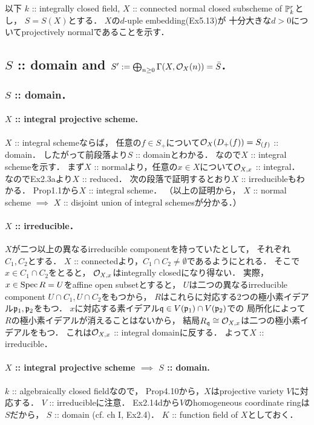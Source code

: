 \documentclass[a4paper]{jsarticle}
\begin{document}
    以下
    $k$ :: integrally closed field,
    $X$ :: connected normal closed subscheme of $\mathbb{P}_k^r$とし，
    $S=S(X)$とする．
    $X$の$d$-uple embedding(Ex5.13)が
    十分大きな$d>0$についてprojectively normalであることを示す．

    \subsection{$S$ :: domain and $S':=\bigoplus_{n \geq 0} \Gamma(X,\mathcal{O}_X(n))=\bar{S}$.}
    \subsubsection{$S$ :: domain．}
    \paragraph{$X$ :: integral projective scheme.}
    $X$ :: integral schemeならば，
    任意の$f \in S_+$について$\mathcal{O}_X(D_+(f))=S_{(f)}$ :: domain．
    したがって前段落より$S$ :: domainとわかる．
    なので$X$ :: integral schemeを示す．
    まず$X$ :: normalより，任意の$x \in X$について$\mathcal{O}_{X,x}$ :: integral．
    なのでEx2.3aより$X$ :: reduced．
    次の段落で証明するとおり$X$ :: irreducibleもわかる．
    Prop1.1から$X$ :: integral scheme．
    （以上の証明から，
    $X$ :: normal scheme $\implies$ $X$ :: disjoint union of integral schemesが分かる．）

    \paragraph{$X$ :: irreducible．}
    $X$が二つ以上の異なるirreducible componentを持っていたとして，
    それぞれ$C_1, C_2$とする．
    $X$ :: connectedより，$C_1 \cap C_2 \neq \emptyset$であるようにとれる．
    そこで$x \in C_1 \cap C_2$をとると，
    $\mathcal{O}_{X,x}$はintegrally closedになり得ない．
    実際，
    $x \in \operatorname{Spec} R=U$をaffine open subsetとすると，
    $U$は二つの異なるirreducible component $U \cap C_1, U \cap C_2$をもつから，
    $R$はこれらに対応する2つの極小素イデアル$\mathfrak{p}_1, \mathfrak{p}_2$をもつ．
    $x$に対応する素イデアル$\mathfrak{q} \in V(\mathfrak{p}_1) \cap V(\mathfrak{p}_2)$での
    局所化によって$R$の極小素イデアルが消えることはないから，
    結局$R_{\mathfrak{q}} \cong \mathcal{O}_{X,x}$は二つの極小素イデアルをもつ．
    これは$\mathcal{O}_{X,x}$ :: integral domainに反する．
    よって$X$ :: irreducible．

    \paragraph{$X$ :: integral projective scheme $\implies$ $S$ :: domain.}
    $k$ :: algebraically closed fieldなので，
    Prop4.10から，$X$はprojective variety $V$に対応する．
    $V$ :: irreducibleに注意．
    Ex2.14dから$V$のhomogeneous coordinate ringは$S$だから，
    $S$ :: domain (cf. ch I, Ex2.4)．
    $K$ :: function field of $X$としておく．
\end{document}
